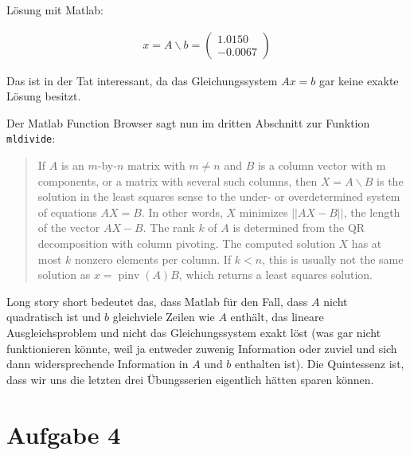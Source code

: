 \documentclass[11pt]{article} %
\begin{document}
Lösung mit Matlab:

\begin{eqnarray*}
x = A \backslash b = \begin{pmatrix} 1.0150 \\ -0.0067 \end{pmatrix}
\end{eqnarray*}

Das ist in der Tat interessant, da das Gleichungssystem $Ax = b$ gar keine exakte Lösung besitzt.

Der Matlab Function Browser sagt nun im dritten Abschnitt zur Funktion {\tt mldivide}:

\begin{quote}
If $A$ is an $m$-by-$n$ matrix with $m \neq n$ and $B$ is a column vector with m components, or a matrix with several such columns, then $X = A\backslash B$ is the solution in the least squares sense to the under- or overdetermined system of equations $AX = B$. In other words, $X$ minimizes $||AX - B||$, the length of the vector  $AX - B$. The rank $k$ of $A$ is determined from the QR decomposition with column pivoting. The computed solution $X$ has at most $k$ nonzero elements per column. If $k < n$, this is usually not the same solution as $x = \operatorname{pinv}(A)B$, which returns a least squares solution.
\end{quote}

Long story short bedeutet das, dass Matlab für den Fall, dass $A$ nicht quadratisch ist und $b$ gleichviele Zeilen wie $A$ enthält, das lineare Ausgleichsproblem und nicht das Gleichungssystem exakt löst (was gar nicht funktionieren könnte, weil ja entweder zuwenig Information oder zuviel und sich dann widersprechende Information in $A$ und $b$ enthalten ist). Die Quintessenz ist, dass wir uns die letzten drei Übungsserien eigentlich hätten sparen können.

\section*{Aufgabe 4}
\end{document}

